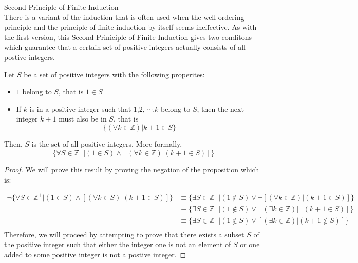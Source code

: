 \begin{definition}
Second Principle of Finite Induction \\

There is a variant of the induction that is often used when the well-ordering principle and the principle of finite induction by itself seems ineffective. As with the first version, this Second Priniciple of Finite Induction gives two conditons which guarantee that a certain set of positive integers actually consists of all postive integers. 


\begin{tcolorbox}
    \begin{theorem}
        Let $S$ be a set of positive integers with the following properites: 
            \begin{itemize}
                \item $1$ belong to $S$, that is  $1 \in S$
                \item If $k$ is in a positive integer such that 1,2, $\cdots$,$k$ belong to $S$, then the next integer $k+1$ must also be in $S$, that is 
                    \begin{equation*}
                        \{ (\forall k \in \mathbb{Z}) | k+1 \in S \}
                    \end{equation*}
            \end{itemize}
        Then, $S$ is the set of all positive integers. More formally,
            \begin{equation*}
                \{\forall S \in \mathbb{Z}^+|(1 \in S)\wedge [(\forall k \in \mathbb{Z}) | (k+1 \in S)] \}
            \end{equation*}
    \end{theorem}
\end{tcolorbox}

\begin{proof}

    We will prove this result by proving the negation of the proposition which is: 
    
        \begin{align*}
            \neg \{\forall S \in \mathbb{Z}^+|(1 \in S)\wedge [(\forall k \in S) | (k+1 \in S)] \} & \equiv \{\exists S \in \mathbb{Z}^+| (1 \notin S)\vee \neg [(\forall k \in \mathbb{Z}) | (k+1 \in S)] \} \nonumber\\
                   & \equiv \{\exists S \in \mathbb{Z}^+| (1 \notin S)\vee [(\exists k \in \mathbb{Z}) | \neg (k+1 \in S)] \} \nonumber\\
                   & \equiv \{\exists S \in \mathbb{Z}^+| (1 \notin S)\vee [(\exists k \in \mathbb{Z}) | (k+1 \notin S)] \} \nonumber\\
        \end{align*}
    Therefore, we will proceed by attempting to prove that there exists a subset $S$ of the positive integer such that either the integer one is not an element of $S$ or one added to some positive integer is not a postive integer. 


\end{proof}
\end{definition}
